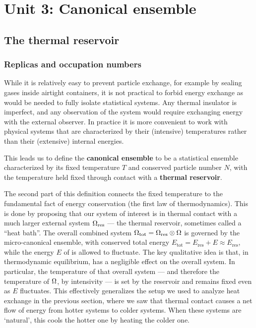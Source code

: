 \renewcommand{\thisunit}{MATH327 Unit 3}
\renewcommand{\moddate}{Last modified 26 Feb.~2024}
\setcounter{section}{3}
\setcounter{subsection}{0}
{}
\section*{Unit 3: Canonical ensemble}
\subsection{\label{sec:reservoir}The thermal reservoir}
\subsubsection{\label{sec:replicas}Replicas and occupation numbers}
While it is relatively easy to prevent particle exchange, for example by sealing gases inside airtight containers, it is not practical to forbid energy exchange as would be needed to fully isolate statistical systems.
Any thermal insulator is imperfect, and any observation of the system would require exchanging energy with the external observer. %
In practice it is more convenient to work with physical systems that are characterized by their (intensive) temperatures rather than their (extensive) internal energies.

\begin{shaded}
  This leads us to define the \textbf{canonical ensemble} to be a statistical ensemble characterized by its fixed temperature $T$ and conserved particle number $N$, with the temperature held fixed through contact with a \textbf{thermal reservoir}.
\end{shaded}

The second part of this definition connects the fixed temperature to the fundamental fact of energy conservation (the first law of thermodynamics).
This is done by proposing that our system of interest \Om is in thermal contact with a much larger external system $\Omega_{\text{res}}$ --- the thermal reservoir, sometimes called a ``heat bath''.
The overall combined system $\Omega_{\text{tot}} = \Omega_{\text{res}} \otimes \Omega$ is governed by the micro-canonical ensemble, with conserved total energy $E_{\text{tot}} = E_{\text{res}} + E \approx E_{\text{res}}$, while the energy $E$ of \Om is allowed to fluctuate. %
The key qualitative idea is that, in thermodynamic equilibrium, \Om has a negligible effect on the overall system.
In particular, the temperature of that overall system --- and therefore the temperature of $\Omega$, by intensivity --- is set by the reservoir and remains fixed even as $E$ fluctuates.
This effectively generalizes the setup we used to analyze heat exchange in the previous section, where we saw that thermal contact causes a net flow of energy from hotter systems to colder systems.
When these systems are `natural', this cools the hotter one by heating the colder one.

